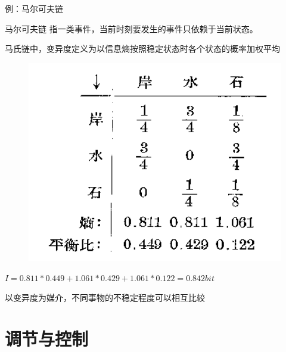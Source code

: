 \documentclass[12pt,AutoFakeBold,aspectratio=43,mathserif]{beamer}
\begin{document}
		\begin{frame}{例：马尔可夫链}
			\begin{block}{马尔可夫链}
				指一类事件，当前时刻要发生的事件只依赖于当前状态。
			\end{block}
			
			\quad 马氏链中，变异度定义为以信息熵按照稳定状态时各个状态的概率加权平均
            \begin{figure}
                \centering
                \includegraphics[width =.4\textwidth]{figures/figure2_2.PNG}
            \end{figure}
			$I = 0.811 * 0.449 + 1.061 * 0.429 + 1.061 * 0.122 = 0.842bit$
			
		 	\quad 以变异度为媒介，不同事物的不稳定程度可以相互比较
			
		\end{frame}

    \section{调节与控制}
\end{document}
